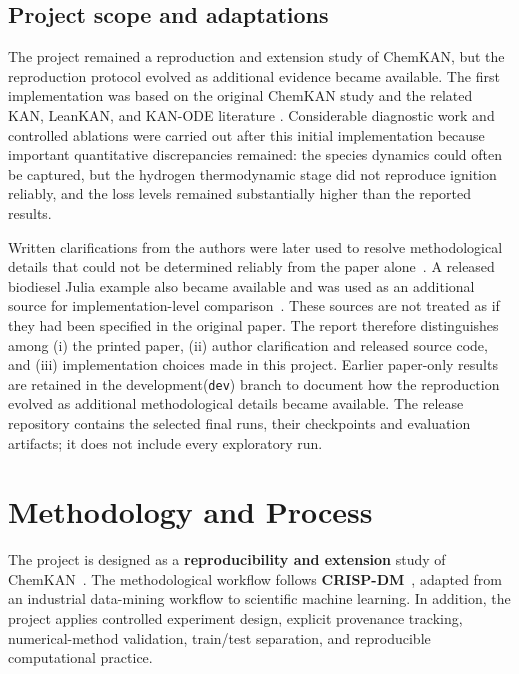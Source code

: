 \documentclass[11pt,a4paper]{article}
\begin{document}
\subsection{Project scope and adaptations}

The project remained a reproduction and extension study of ChemKAN, but the reproduction protocol evolved as additional evidence became available. 
The first implementation was based on
the original ChemKAN study and the related
KAN, LeanKAN, and KAN-ODE literature \cite{Koenig_2025,ICLR2025_afaed896,
LeanKAN2025,KANODE2024}. Considerable diagnostic work and controlled ablations were carried out after this initial implementation because important quantitative discrepancies remained: the species dynamics could often be captured, but the hydrogen thermodynamic stage did not reproduce ignition reliably, and the loss levels remained substantially higher than the reported results.

Written clarifications from the authors were later used to resolve methodological details that could not be determined reliably from the paper alone~\cite{ChemKANAuthors2026}. A released biodiesel Julia example also became available and was used as an additional source for implementation-level comparison~\cite{ChemKANRepo2026}. These sources are not treated as if they had been specified in the original paper. The report therefore distinguishes among (i) the printed paper, (ii) author clarification and released source code, and (iii) implementation choices made in this project. Earlier paper-only results are retained in the development(\texttt{dev}) branch to document how the reproduction evolved as additional methodological details became available. The release repository contains the selected final runs, their checkpoints and evaluation artifacts; it does not include every exploratory run.

\section{Methodology and Process}

The project is designed as a \textbf{reproducibility and extension} study of ChemKAN~\cite{Koenig_2025}. The methodological workflow follows \textbf{CRISP-DM}~\cite{Chapman2000CRISPDM}, adapted from an industrial data-mining workflow to scientific machine learning. In addition, the project applies controlled experiment design, explicit provenance tracking, numerical-method validation, train/test separation, and reproducible computational practice.
\end{document}
